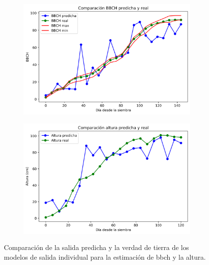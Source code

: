 \begin{figure}[H]
\centering
\begin{subfigure}{.65\textwidth}
\includegraphics[width=0.95\linewidth]{archivos/tfg/Mean/TEST_PARC_FINAL}
\end{subfigure}
\begin{subfigure}{.65\textwidth}
\centering
\includegraphics[width=0.95\linewidth]{archivos/tfg/Mean/TEST_PARC_FINAL_H}
\end{subfigure}
\caption{Comparación de la salida predicha y la verdad de tierra de los modelos de salida individual para la estimación de \gls{bbch} y la altura.}
\end{figure}

